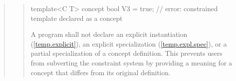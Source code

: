 \begin{quote}
\begin{xremovedblock}
\begin{quote}
\begin{codeblock}
template<C T> 
  concept bool V3 = true;  // error: constrained template declared as a concept
\end{codeblock}
\exitexample

\pnum
A program shall not declare an explicit instantiation (\ref{temp.explicit}), 
an explicit specialization (\ref{temp.expl.spec}), or a partial specialization
of a concept definition.
%
\enternote
This prevents users from subverting the constraint system by providing a 
meaning for a concept that differs from its original definition.
\exitnote

\end{quote}
\end{xremovedblock}
\end{quote}